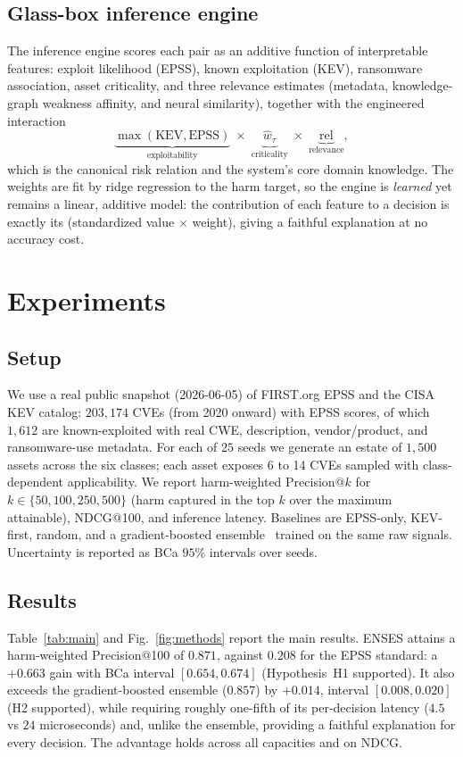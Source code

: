 \documentclass[review,3p,times]{elsarticle}
\begin{document}
\subsection{Glass-box inference engine}
The inference engine scores each pair as an additive function of interpretable
features: exploit likelihood (EPSS), known exploitation (KEV), ransomware
association, asset criticality, and three relevance estimates (metadata,
knowledge-graph weakness affinity, and neural similarity), together with the
engineered interaction
\begin{equation}
\underbrace{\max(\mathrm{KEV},\mathrm{EPSS})}_{\text{exploitability}}\;\times\;
\underbrace{\hat{w}_\tau}_{\text{criticality}}\;\times\;
\underbrace{\mathrm{rel}}_{\text{relevance}},
\end{equation}
which is the canonical risk relation and the system's core domain knowledge. The
weights are fit by ridge regression to the harm target, so the engine is
\emph{learned} yet remains a linear, additive model: the contribution of each
feature to a decision is exactly its (standardized value $\times$ weight), giving
a faithful explanation at no accuracy cost.

\section{Experiments}
\label{sec:exp}
\subsection{Setup}
We use a real public snapshot (2026-06-05) of FIRST.org EPSS and the CISA KEV
catalog: $203{,}174$ CVEs (from 2020 onward) with EPSS scores, of which
$1{,}612$ are known-exploited with real CWE, description, vendor/product, and
ransomware-use metadata. For each of $25$ seeds we generate an estate of
$1{,}500$ assets across the six classes; each asset exposes 6 to 14 CVEs sampled
with class-dependent applicability. We report harm-weighted Precision@$k$ for
$k\in\{50,100,250,500\}$ (harm captured in the top $k$ over the maximum
attainable), NDCG@100, and inference latency. Baselines are EPSS-only, KEV-first,
random, and a gradient-boosted ensemble~\cite{chen2016xgboost} trained on the
same raw signals. Uncertainty is reported as BCa $95\%$ intervals over seeds.



\subsection{Results}
Table~\ref{tab:main} and Fig.~\ref{fig:methods} report the main results. ENSES
attains a harm-weighted Precision@100 of $0.871$, against $0.208$ for the EPSS
standard: a $+0.663$ gain with BCa interval $[0.654,0.674]$ (Hypothesis~H1
supported). It also exceeds the gradient-boosted ensemble ($0.857$) by $+0.014$,
interval $[0.008,0.020]$ (H2 supported), while requiring roughly one-fifth of
its per-decision latency ($4.5$ vs $24$ microseconds) and, unlike the ensemble,
providing a faithful explanation for every decision. The advantage holds across
all capacities and on NDCG.
\end{document}
